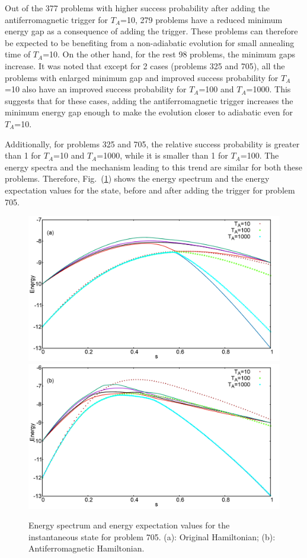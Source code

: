 \documentclass[../main.tex]{subfiles}
\begin{document}
Out of the 377 problems with higher success probability after adding the antiferromagnetic trigger for $T_A$=10, 279 problems have a reduced minimum energy gap as a consequence of adding the trigger. These problems can therefore be expected to be benefiting from a non-adiabatic evolution for small annealing time of $T_A$=10. On the other hand, for the rest 98 problems, the minimum gaps increase. It was noted that except for 2 cases (problems 325 and 705), all the problems with enlarged minimum gap and improved success probability for $T_A$=10 also have an improved success probability for $T_A$=100 and $T_A$=1000. This suggests that for these cases, adding the antiferromagnetic trigger increases the minimum energy gap enough to make the evolution closer to adiabatic even for $T_A$=10. 
\newpage

Additionally, for problems 325 and 705, the relative success probability is greater than 1 for $T_A$=10 and $T_A$=1000, while it is smaller than 1 for $T_A$=100. The energy spectra and the mechanism leading to this trend are similar for both these problems. Therefore, Fig.~(\ref{fig:a24}) shows the energy spectrum and the energy expectation values for the state, before and after adding the trigger for problem 705.

\begin{figure}[H]
\centering 
\includegraphics[scale=0.24]{705_O_T.png}
\includegraphics[scale=0.24]{705_A_T_g1.png}
\caption{Energy spectrum and energy expectation values for the instantaneous state for problem 705. (a): Original Hamiltonian; (b): Antiferromagnetic Hamiltonian. }
\label{fig:a24}
\end{figure}
\end{document}
